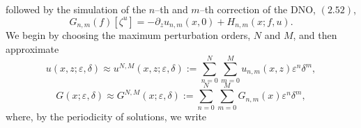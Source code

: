 followed by the simulation of the $n$--th and $m$--th correction of the DNO, $(2.52)$,
\begin{equation*}G_{n,m}(f)[\zeta^u]=-\partial_z u_{n,m}(x,0)+ H_{n,m}(x;f,u).\end{equation*}
We begin by choosing the maximum perturbation orders, $N$ and $M$, and then approximate
\begin{equation}
u(x,z;\varepsilon,\delta)\approx u^{N,M}(x,z;\varepsilon,\delta):=\sum_{n=0}^N\sum_{m=0}^{M}u_{n,m}(x,z)\varepsilon^n\delta^m,
\end{equation}
\begin{equation}
G(x;\varepsilon,\delta)\approx G^{N,M}(x;\varepsilon,\delta) :=\sum_{n=0}^N\sum_{m=0}^{M}G_{n,m}(x)\varepsilon^n\delta^m,
\end{equation}
where, by the periodicity of solutions, we write

